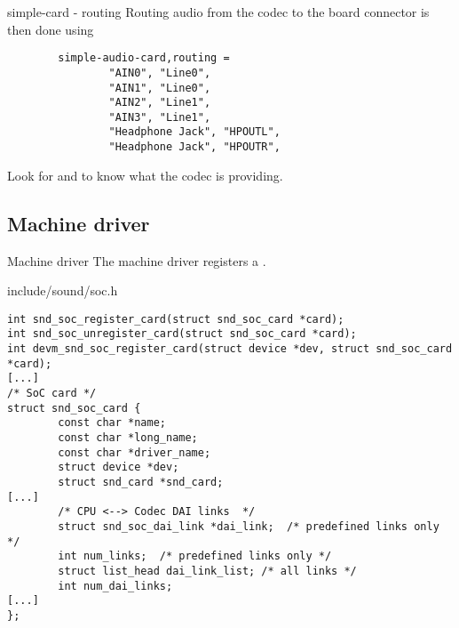 \begin{frame}[fragile]{simple-card - routing}
  Routing audio from the codec to the board connector is then done
  using 
  \begin{block}{}
    \fontsize{7}{6}\selectfont
    \begin{verbatim}
        simple-audio-card,routing =
                "AIN0", "Line0",
                "AIN1", "Line0",
                "AIN2", "Line1",
                "AIN3", "Line1",
                "Headphone Jack", "HPOUTL",
                "Headphone Jack", "HPOUTR",
    \end{verbatim}
  \end{block}
  Look for  and  to
  know what the codec is providing.
\end{frame}

\subsection{Machine driver}

\begin{frame}[fragile]{Machine driver}
The machine driver registers a .
      \begin{block}{include/sound/soc.h}
        \fontsize{8}{8}\selectfont
        \begin{verbatim}
int snd_soc_register_card(struct snd_soc_card *card);
int snd_soc_unregister_card(struct snd_soc_card *card);
int devm_snd_soc_register_card(struct device *dev, struct snd_soc_card *card);
[...]
/* SoC card */
struct snd_soc_card {
        const char *name;
        const char *long_name;
        const char *driver_name;
        struct device *dev;
        struct snd_card *snd_card;
[...]
        /* CPU <--> Codec DAI links  */
        struct snd_soc_dai_link *dai_link;  /* predefined links only */
        int num_links;  /* predefined links only */
        struct list_head dai_link_list; /* all links */
        int num_dai_links;
[...]
};
        \end{verbatim}
      \end{block}
\end{frame}

